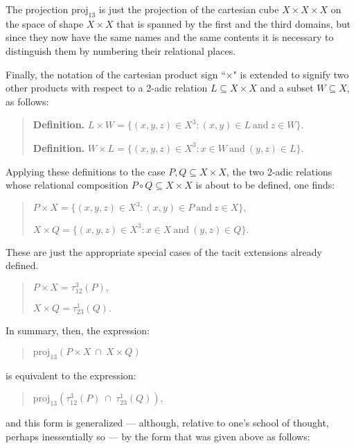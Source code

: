\documentclass[12pt]{article}
\begin{document}
The projection $\mathrm{proj}_{13}$ is just the projection of the cartesian cube $X \times X \times X$ on the space of shape $X \times X$ that is spanned by the first and the third domains, but since they now have the same names and the same contents it is necessary to distinguish them by numbering their relational places.

Finally, the notation of the cartesian product sign ``$\times$" is extended to signify two other products with respect to a 2-adic relation $L \subseteq X \times X$ and a subset $W \subseteq X$, as follows:

\begin{quote}
\textbf{Definition.}  $L \times W = \{ (x, y, z) \in X^3 : (x, y) \in L\ \mathrm{and}\ z \in W \}.$

\textbf{Definition.}  $W \times L = \{ (x, y, z) \in X^3 : x \in W\ \mathrm{and}\ (y, z) \in L \}.$
\end{quote}

Applying these definitions to the case $P, Q \subseteq X \times X$, the two 2-adic relations whose relational composition $P \circ Q \subseteq X \times X$ is about to be defined, one finds:

\begin{quote}
$P \times X = \{ (x, y, z) \in X^3 : (x, y) \in P\ \mathrm{and}\ z \in X \},$

$X \times Q = \{ (x, y, z) \in X^3 : x \in X\ \mathrm{and}\ (y, z) \in Q \}.$
\end{quote}

These are just the appropriate special cases of the tacit extensions already defined.

\begin{quote}
$P \times X = \tau_{12}^3(P),$

$X \times Q = \tau_{23}^1(Q).$
\end{quote}

In summary, then, the expression:

\begin{quote}
$\mathrm{proj}_{13}(P \times X\ \cap\ X \times Q)$
\end{quote}

is equivalent to the expression:

\begin{quote}
$\mathrm{proj}_{13}(\tau_{12}^3(P)\ \cap\ \tau_{23}^1(Q)),$
\end{quote}

and this form is generalized --- although, relative to one's school of thought, perhaps inessentially so --- by the form that was given above as follows:
\end{document}
